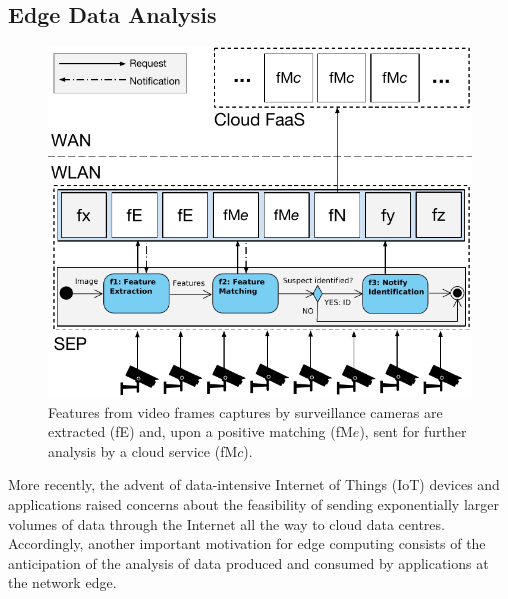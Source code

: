 \documentclass[letterpaper, 10 pt, conference]{ieeeconf}  %
\begin{document}


\subsection{Edge Data Analysis}

\begin{figure}[tbp]
	\centering
	\includegraphics[width=\linewidth]{Figs/Edge_Data_Analytics_Video_Surveillance.pdf}
	\caption{Features from video frames captures by surveillance cameras are extracted (fE) and, upon a positive matching (fM$e$), sent for further analysis by a cloud service (fM$c$).} 
	\label{fig:Edge_Data_Analytics_Video_Surveillance}
\end{figure}

More recently, the advent of data-intensive Internet of Things (IoT) devices and applications raised concerns about the feasibility of sending exponentially larger volumes of data through the Internet all the way to cloud data centres. Accordingly, another important motivation for edge computing consists of the anticipation of the analysis of data produced and consumed by applications at the network edge. 
\end{document}
